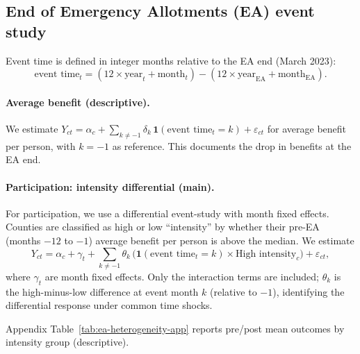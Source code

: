 \subsection{End of Emergency Allotments (EA) event study}
\label{sec:ea}

Event time is defined in integer months relative to the EA end (March 2023):
\begin{equation}
\text{event time}_t = (12 \times \text{year}_t + \text{month}_t) - (12 \times \text{year}_{\text{EA}} + \text{month}_{\text{EA}}).
\end{equation}

\paragraph{Average benefit (descriptive).}
We estimate $Y_{ct} = \alpha_c + \sum_{k \neq -1} \delta_k \,\mathbf{1}(\text{event time}_t = k) + \varepsilon_{ct}$ for average benefit per person, with $k=-1$ as reference. This documents the drop in benefits at the EA end.


\paragraph{Participation: intensity differential (main).}
For participation, we use a differential event-study with month fixed effects. Counties are classified as high or low ``intensity'' by whether their pre-EA (months $-12$ to $-1$) average benefit per person is above the median. We estimate
\begin{equation}
Y_{ct} = \alpha_c + \gamma_t + \sum_{k \neq -1} \theta_k \,\big(\mathbf{1}(\text{event time}_t = k) \times \text{High intensity}_c\big) + \varepsilon_{ct},
\end{equation}
where $\gamma_t$ are month fixed effects. Only the interaction terms are included; $\theta_k$ is the high-minus-low difference at event month $k$ (relative to $-1$), identifying the differential response under common time shocks.


Appendix Table~\ref{tab:ea-heterogeneity-app} reports pre/post mean outcomes by intensity group (descriptive).
